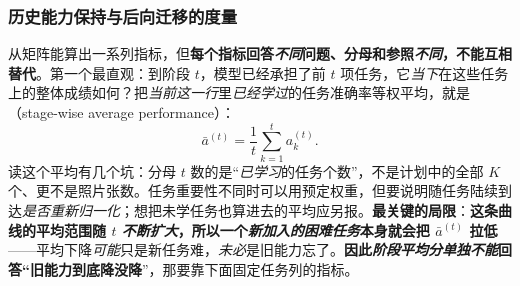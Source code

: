 \subsubsection{历史能力保持与后向迁移的度量}
\label{sec:ket-evaluation-backward}

从矩阵能算出一系列指标，但\textbf{每个指标回答\emph{不同}问题、分母和参照\emph{不同}，不能互相替代}。第一个最直观：到阶段 $t$，模型已经承担了前 $t$ 项任务，它\emph{当下}在这些任务上的整体成绩如何？把\emph{当前这一行}里\emph{已经学过}的任务准确率等权平均，就是（stage-wise average performance）：
\begin{equation}
  \bar a^{(t)}=\frac1t\sum_{k=1}^{t}a_k^{(t)}.
  \label{eq:ket-evaluation-stage-average}
\end{equation}
读这个平均有几个坑：分母 $t$ 数的是“\emph{已学习}的任务个数”，不是计划中的全部 $K$ 个、更不是照片张数。任务重要性不同时可以用预定权重，但要说明随任务陆续到达\emph{是否重新归一化}；想把未学任务也算进去的平均应另报。\textbf{最关键的局限}：\textbf{这条曲线的平均范围随 $t$ \emph{不断扩大}，所以一个\emph{新加入的困难任务}本身就会把 $\bar a^{(t)}$ 拉低}——平均下降\emph{可能}只是新任务难，\emph{未必}是旧能力忘了。\textbf{因此\emph{阶段平均分\emph{单独}不能}回答“旧能力到底降没降}”，那要靠下面固定任务列的指标。

